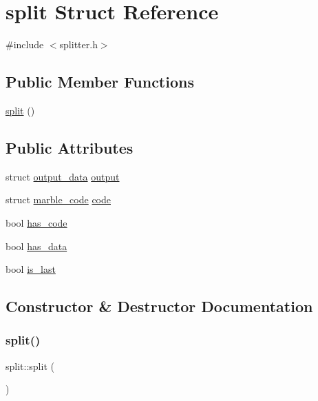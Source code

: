 \hypertarget{structsplit}{}\section{split Struct Reference}
\label{structsplit}


{\ttfamily \#include $<$splitter.\+h$>$}

\subsection*{Public Member Functions}
\begin{DoxyCompactItemize}
\item 
\hyperlink{structsplit_a63f2e1ea2dbcb9973b0f2424c4099d3a}{split} ()
\end{DoxyCompactItemize}
\subsection*{Public Attributes}
\begin{DoxyCompactItemize}
\item 
struct \hyperlink{structoutput__data}{output\+\_\+data} \hyperlink{structsplit_a3efed1338c7ccad093d30c6d94269b6a}{output}
\item 
struct \hyperlink{structmarble__code}{marble\+\_\+code} \hyperlink{structsplit_a8fc2329ce8e3049edfe903fdca076a17}{code}
\item 
bool \hyperlink{structsplit_acc437a097a9733aa0b7c591ec784b271}{has\+\_\+code}
\item 
bool \hyperlink{structsplit_ae2277765e4758fe975c5530dd814c849}{has\+\_\+data}
\item 
bool \hyperlink{structsplit_a13efd7b839008fc3e019b1422fe8ff15}{is\+\_\+last}
\end{DoxyCompactItemize}


\subsection{Constructor \& Destructor Documentation}
\mbox{\label{structsplit_a63f2e1ea2dbcb9973b0f2424c4099d3a}} 
\subsubsection{\texorpdfstring{split()}{split()}}
{\footnotesize\ttfamily split\+::split (\begin{DoxyParamCaption}{ }\end{DoxyParamCaption})}



